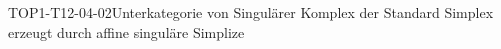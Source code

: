 
\begin{DEF}{TOP1-T12-04-02}{Unterkategorie von Singulärer Komplex der Standard Simplex erzeugt durch affine singuläre Simplize}
\end{DEF}
